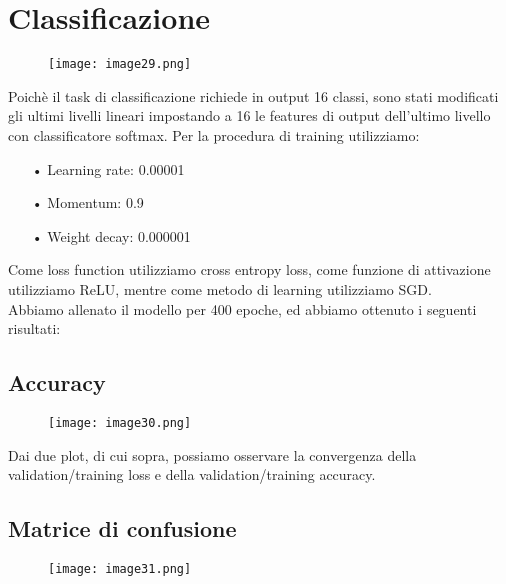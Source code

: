 \section{Classificazione}
\begin{figure}[H]
	\centering
	\texttt{[image: image29.png]}
\end{figure}
Poichè il task di classificazione richiede in output 16 classi, sono stati modificati gli ultimi livelli lineari impostando a 16 le features di output dell’ultimo livello con classificatore softmax.
Per la procedura di training utilizziamo: 
\begin{itemize}
	\item[•]Learning rate: 0.00001
	\item[•]Momentum: 0.9
	\item[•]Weight decay: 0.000001
\end{itemize}
Come loss function utilizziamo cross entropy loss, come funzione di attivazione utilizziamo ReLU, mentre come metodo di learning utilizziamo SGD. \\
Abbiamo allenato il modello per 400 epoche, ed abbiamo ottenuto i seguenti risultati:

\subsection{Accuracy}
\begin{figure}[H]
	\centering
	\texttt{[image: image30.png]}
\end{figure}
Dai due plot, di cui sopra, possiamo osservare la convergenza della validation/training loss e della validation/training accuracy.

\subsection{Matrice di confusione}
\begin{figure}[H]
	\centering
	\texttt{[image: image31.png]}
\end{figure}

